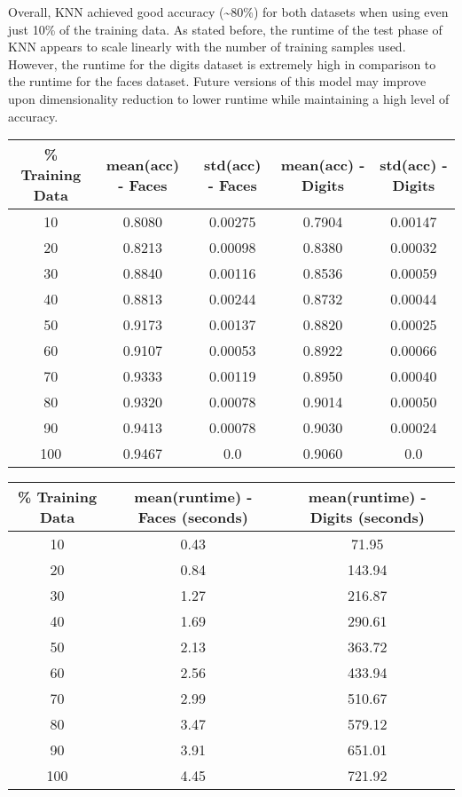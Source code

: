 \documentclass[11pt]{article}
\begin{document}
    Overall, KNN achieved good accuracy (\textasciitilde 80\%) for both datasets when using even just 10\% of the training data.
    As stated before, the runtime of the test phase of KNN appears to scale linearly with the number
    of training samples used.
    However, the runtime for the digits dataset is extremely high in comparison to the runtime for the faces dataset.
    Future versions of this model may improve upon dimensionality reduction to lower runtime while maintaining a high level of accuracy.
    \small
    \begin{center}
    \begin{tabular}{||c|c c|c c||}
     \hline
     \% Training Data & mean(acc) - Faces & std(acc) - Faces & mean(acc) - Digits & std(acc) - Digits \\ [0.5ex]
     \hline\hline
     10 & 0.8080 & 0.00275 & 0.7904 & 0.00147 \\
     \hline
     20 & 0.8213 & 0.00098 & 0.8380 & 0.00032 \\
     \hline
     30 & 0.8840 & 0.00116 & 0.8536 & 0.00059 \\
     \hline
     40 & 0.8813 & 0.00244 & 0.8732 & 0.00044 \\
     \hline
     50 & 0.9173 & 0.00137 & 0.8820 & 0.00025 \\
     \hline
     60 & 0.9107 & 0.00053 & 0.8922 & 0.00066 \\
     \hline
     70 & 0.9333 & 0.00119 & 0.8950 & 0.00040 \\
     \hline
     80 & 0.9320 & 0.00078 & 0.9014 & 0.00050 \\
     \hline
     90 & 0.9413 & 0.00078 & 0.9030 & 0.00024 \\
     \hline
     100 & 0.9467 & 0.0 & 0.9060 & 0.0 \\
     \hline
    \end{tabular}
    \newpage
    \begin{tabular}{||c|c|c||}
     \hline
     \% Training Data & mean(runtime) - Faces (seconds) & mean(runtime) - Digits (seconds) \\ [0.5ex]
     \hline\hline
     10 & 0.43 & 71.95 \\
     \hline
     20 & 0.84 & 143.94 \\
     \hline
     30 & 1.27 & 216.87 \\
     \hline
     40 & 1.69 & 290.61 \\
     \hline
     50 & 2.13 & 363.72 \\
     \hline
     60 & 2.56 & 433.94 \\
     \hline
     70 & 2.99 & 510.67 \\
     \hline
     80 & 3.47 & 579.12 \\
     \hline
     90 & 3.91 & 651.01 \\
     \hline
     100 & 4.45 & 721.92 \\
     \hline
    \end{tabular}
    \end{center}
\end{document}
